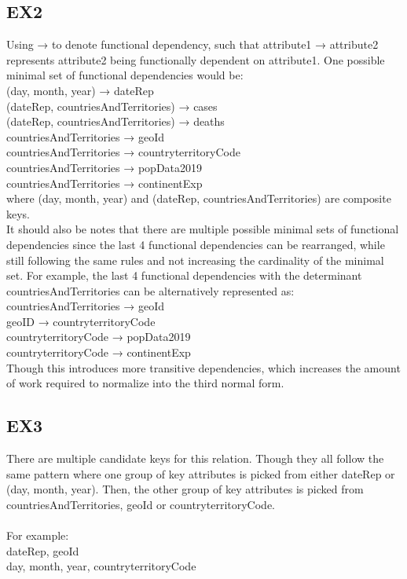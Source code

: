 \documentclass{article}
\begin{document}
\subsection{EX2}
Using → to denote functional dependency, such that attribute1 → attribute2 represents attribute2 being functionally dependent on attribute1. One possible minimal set of functional dependencies would be: \\
\indent (day, month, year) → dateRep \\
\indent (dateRep, countriesAndTerritories) → cases \\
\indent (dateRep, countriesAndTerritories) → deaths \\
\indent countriesAndTerritories → geoId \\
\indent countriesAndTerritories → countryterritoryCode \\
\indent countriesAndTerritories → popData2019 \\
\indent countriesAndTerritories → continentExp \\

where (day, month, year) and (dateRep, countriesAndTerritories) are composite keys. \\

It should also be notes that there are multiple possible minimal sets of functional dependencies since the last 4 functional dependencies can be rearranged, while still following the same rules and not increasing the cardinality of the minimal set. For example, the last 4 functional dependencies with the determinant countriesAndTerritories can be alternatively represented as: \\
\indent countriesAndTerritories → geoId \\
\indent geoID → countryterritoryCode \\
\indent countryterritoryCode → popData2019 \\
\indent countryterritoryCode → continentExp \\

Though this introduces more transitive dependencies, which increases the amount of work required to normalize into the third normal form.

\subsection{EX3}
There are multiple candidate keys for this relation. Though they all follow the same pattern where one group of key attributes is picked from either dateRep or (day, month, year). Then, the other group of key attributes is picked from countriesAndTerritories, geoId or countryterritoryCode. \\\\
For example: \\
\indent dateRep, geoId \\
\indent day, month, year, countryterritoryCode 
\end{document}
